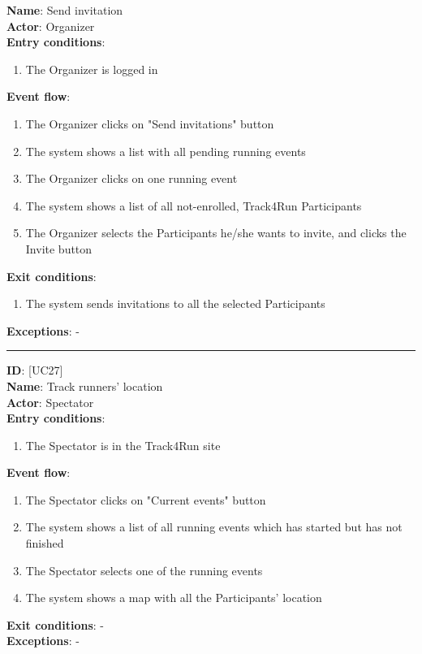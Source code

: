 \documentclass[a4paper, hidelinks, 12pt]{report}
\newcommand\usecase[1]{ [UC#1] }
\begin{document}
\begin{itemize}
		\textbf{Name}: Send invitation \\
		\textbf{Actor}: Organizer \\
		\textbf{Entry conditions}:
		\begin{enumerate}
			\item{The Organizer is logged in}
		\end{enumerate}
		\textbf{Event flow}:
		\begin{enumerate}
			\item{The Organizer clicks on "Send invitations" button}
			\item{The system shows a list with all pending running events}
			\item{The Organizer clicks on one running event}
			\item{The system shows a list of all not-enrolled, Track4Run Participants}
			\item{The Organizer selects the Participants he/she wants to invite, and clicks the Invite button}
		\end{enumerate}
		\textbf{Exit conditions}:
		\begin{enumerate}
			\item{The system sends invitations to all the selected Participants}
		\end{enumerate}
		\textbf{Exceptions}: - \\
		\rule{\linewidth}{0.4pt}
		\textbf{ID}: \usecase{27} \\
		\textbf{Name}: Track runners' location \\
		\textbf{Actor}: Spectator \\
		\textbf{Entry conditions}:
		\begin{enumerate}
			\item{The Spectator is in the Track4Run site}
		\end{enumerate}
		\textbf{Event flow}:
		\begin{enumerate}
			\item{The Spectator clicks on "Current events" button}
			\item{The system shows a list of all running events which has started but has not finished}
			\item{The Spectator selects one of the running events}
			\item{The system shows a map with all the Participants' location}
		\end{enumerate}
		\textbf{Exit conditions}: - \\
		\textbf{Exceptions}: - \\

\end{itemize}
\end{document}
